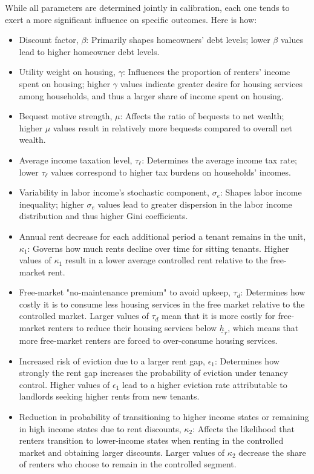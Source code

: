 \documentclass[parskip=full]{article}
\begin{document}
While all parameters are determined jointly in calibration, each one tends to exert a more significant influence on specific outcomes. Here is how:
\begin{itemize}
    \item Discount factor, $\beta$: Primarily shapes homeowners' debt levels; lower $\beta$ values lead to higher homeowner debt levels.
    \item Utility weight on housing, $\gamma$: Influences the proportion of renters' income spent on housing; higher $\gamma$ values indicate greater desire for housing services among households, and thus a larger share of income spent on housing.
    \item Bequest motive strength, $\mu$: Affects the ratio of bequests to net wealth; higher $\mu$ values result in relatively more bequests compared to overall net wealth.
    \item Average income taxation level, $\tau_{\ell}$: Determines the average income tax rate; lower $\tau_{\ell}$ values correspond to higher tax burdens on households' incomes.
    \item Variability in labor income's stochastic component, $\sigma_{e}$: Shapes labor income inequality; higher $\sigma_{e}$ values lead to greater dispersion in the labor income distribution and thus higher Gini coefficients.
    \item Annual rent decrease for each additional period a tenant remains in the unit, $\kappa_1$: Governs how much rents decline over time for sitting tenants. Higher values of $\kappa_1$ result in a lower average controlled rent relative to the free-market rent.
    \item Free-market "no-maintenance premium" to avoid upkeep, $\tau_d$: Determines how costly it is to consume less housing services in the free market relative to the controlled market. Larger values of $\tau_d$ mean that it is more costly for free-market renters to reduce their housing services below $\underline{h}_{r}$, which means that more free-market renters are forced to over-consume housing services.
    \item Increased risk of eviction due to a larger rent gap, $\epsilon_1$: Determines how strongly the rent gap increases the probability of eviction under tenancy control. Higher values of $\epsilon_1$ lead to a higher eviction rate attributable to landlords seeking higher rents from new tenants.
    \item Reduction in probability of transitioning to higher income states or remaining in high income states due to rent discounts, $\kappa_2$: Affects the likelihood that renters transition to lower-income states when renting in the controlled market and obtaining larger discounts. Larger values of $\kappa_2$ decrease the share of renters who choose to remain in the controlled segment.

\end{itemize}
\end{document}
